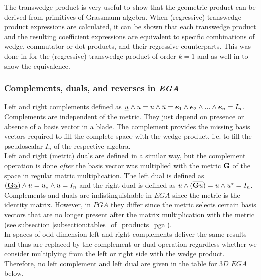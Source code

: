 The transwedge product is very useful to show that the geometric product can be derived
from primitives of Grassmann algebra. When (regressive) transwedge product expressions are
calculated, it can be shown that each transwedge product and the resulting coefficient
expressions are equivalent to specific combinations of wedge, commutator or dot products,
and their regressive counterparts. This was done in
 for the (regressive) transwedge product of
order $k=1$ and as well in  to show the
equivalence.

\newpage

\subsubsection{Complements, duals, and reverses in \textit{EGA}}
\label{subsection:tables_of_products_ega}

Left and right complements defined as $\underline{u}\wedge u = u \wedge \overline{u} =
\bm{e}_{1}\wedge\bm{e}_{2}\wedge...\wedge\bm{e}_{n} = I_{n}$. Complements are independent of the
metric. They just depend on presence or absence of a basis vector in a blade. The
complement provides the missing basis vectors required to fill the complete space with the
wedge product, i.e. to fill the pseudoscalar $I_{n}$ of the respective algebra. \\

Left and right (metric) duals are defined in a similar way, but the complement operation
is done \emph{after} the basis vector was multiplied with the metric $\mathbf{G}$ of the
space in regular matric multiplication. The left dual is defined as $(\underline{\mathbf{G}
u})\wedge u = {u}_\star\wedge u = I_{n}$ and the right dual is defined as $u \wedge
(\overline{\mathbf{G} u}) = u \wedge {u}^\star =I_{n}$. \\

Complements and duals are indistinguishable in $EGA$ since the metric is the identity
matrix. However, in $PGA$ they differ since the metric selects certain basis vectors that
are no longer present after the matrix multiplication with the metric (see subsection
\ref{subsection:tables_of_products_pga}).\\

In spaces of odd dimension left and right complements deliver the same results and thus
are replaced by the complement or dual operation regardless whether we consider
multiplying from the left or right side with the wedge product. Therefore, no left
complement and left dual are given in the table for $3D$ $EGA$ below.\\


